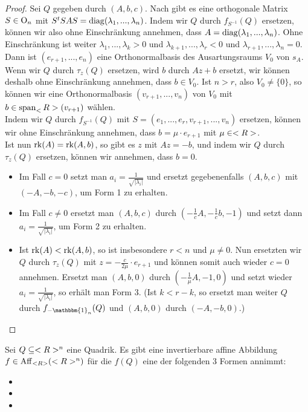 \begin{proof}
	Sei $Q$ gegeben durch $(A,b,c)$. Nach  gibt es eine orthogonale Matrix $S\in\operatorname{O}_n$ mit $S^tSAS=\operatorname{diag}(\lambda_1,...,\lambda_n)$. Indem wir $Q$ durch $f_{S^{-1}}(Q)$ ersetzen, können wir also ohne Einschränkung annehmen, dass $A=\operatorname{diag}(\lambda_1,...,\lambda_n)$. Ohne Einschränkung ist weiter $\lambda_1,...,\lambda_k>0$ und $\lambda_{k+1},...,\lambda_r<0$ und $\lambda_{r+1},...,\lambda_n=0$. Dann ist $(e_{r+1},...,e_n)$ eine Orthonormalbasis des Ausartungsraums $V_0$ von $s_A$. \\ 
	Wenn wir $Q$ durch $\tau_z(Q)$ ersetzen, wird $b$ durch $Az+b$ ersetzt, wir können deshalb ohne Einschränkung annehmen, dass $b\in V_0$. Ist $n>r$, also $V_0\neq \{0\}$, so können wir eine Orthonormalbasis $(v_{r+1},...,v_n)$ von $V_0$ mit $b\in\Span_\real(v_{r+1})$ wählen. \\
	Indem wir $Q$ durch $f_{S^{-1}}(Q)$ mit $S=(e_1,...,e_r,v_{r+1},...,v_n)$ ersetzen, können wir ohne Einschränkung annehmen, dass $b=\mu\cdot e_{r+1}$ mit $\mu\in<R>$. \\
	Ist nun $\operatorname{rk}(A)=\operatorname{rk}(A,b)$, so gibt es $z$ mit $Az=-b$, und indem wir $Q$ durch $\tau_z(Q)$ ersetzen, können wir annehmen, dass $b=0$. 
	\begin{itemize}
		\item Im Fall $c=0$ setzt man $a_i=\frac{1}{\sqrt{\vert \lambda_i\vert}}$ und ersetzt gegebenenfalls $(A,b,c)$ mit $(-A,-b,-c)$, um Form 1 zu erhalten.
		\item Im Fall $c\neq 0$ ersetzt man $(A,b,c)$ durch $(-\frac 1 c A, -\frac 1 c b,-1)$ und setzt dann $a_i=\frac{1}{\sqrt{\vert \lambda_i\vert}}$, um Form 2 zu erhalten.
		\item Ist $\operatorname{rk}(A)<\operatorname{rk}(A,b)$, so ist insbesondere $r<n$ und $\mu\neq 0$. Nun ersetzten wir $Q$ durch $\tau_z(Q)$ mit $z=-\frac{c}{2\mu}\cdot e_{r+1}$ und können somit auch wieder $c=0$ annehmen. Ersetzt man $(A,b,0)$ durch $(-\frac{1}{\mu}A,-1,0)$ und setzt wieder $a_i=\frac{1}{\sqrt{\vert \lambda_i\vert}}$, so erhält man Form 3. (Ist $k<r-k$, so ersetzt man weiter $Q$ durch $f_{-\mathbbm{1}_n}(Q)$ und $(A,b,0)$ durch $(-A,-b,0)$.) 
	\end{itemize}
\end{proof}

\begin{conclusion}
	Sei $Q\subseteq <R>^n$ eine Quadrik. Es gibt eine invertierbare affine Abbildung $f\in\operatorname{Aff}_{<R>}(<R>^n)$ für die $f(Q)$ eine der folgenden 3 Formen annimmt:
	\begin{itemize}
		\item {}
		\item {}
		\item {}
	\end{itemize}
\end{conclusion}

